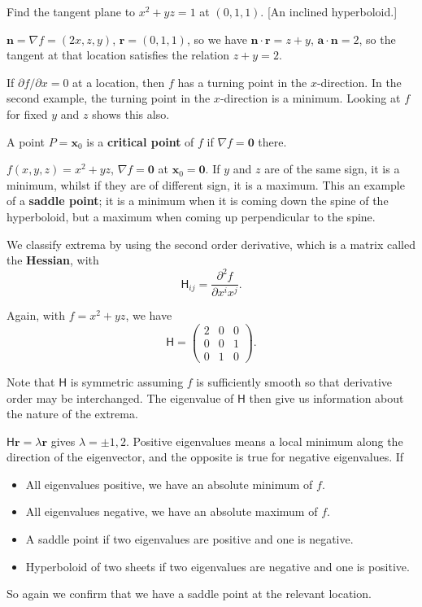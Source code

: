 \documentclass[letter-paper]{tufte-book}
\newenvironment{example}[1][Example]{\begin{trivlist}
\item[\hskip \labelsep {\bfseries #1}]}{\end{trivlist}}
\newcommand{\dy}{\partial}
\newcommand{\ddy}[2]{\frac{\dy#1}{\dy#2}}
\newcommand{\ab}{\boldsymbol{a}}
\newcommand{\nb}{\boldsymbol{n}}
\newcommand{\xb}{\boldsymbol{x}}
\newcommand\Def[1]{\textbf{#1}}
\begin{document}
\begin{example}
	Find the tangent plane to $x^2+yz=1$ at $(0,1,1)$. [An inclined
	hyperboloid.]
	
	$\nb=\nabla f=(2x,z,y)$, $\boldsymbol{r}=(0,1,1)$, so we have
	$\nb\cdot\boldsymbol{r}=z+y$, $\ab\cdot\nb=2$, so the tangent at that
	location satisfies the relation $z+y=2$.
\end{example}
If $\dy f/\dy x=0$ at a location, then $f$ has a turning point in the
$x$-direction. In the second example, the turning point in the $x$-direction is
a minimum. Looking at $f$ for fixed $y$ and $z$ shows this also.

A point $P=\xb_0$ is a \Def{critical point} of $f$ if $\nabla
f=\boldsymbol{0}$ there.
\begin{example}
	$f(x,y,z)=x^2+yz$, $\nabla f=\boldsymbol{0}$ at $\xb_0=\boldsymbol{0}$. If
	$y$ and $z$ are of the same sign, it is a minimum, whilst if they are of
	different sign, it is a maximum. This an example of a \Def{saddle
	point}; it is a minimum when it is coming down the spine of the hyperboloid,
	but a maximum when coming up perpendicular to the spine.
\end{example}

We classify extrema by using the second order derivative, which is a matrix
called the \Def{Hessian}, with
\begin{equation}
	\mathsf{H}_{ij}=\ddy{^2 f}{x^i x^j}.
\end{equation}
\begin{example}
	Again, with $f=x^2+yz$, we have
	\begin{equation*}
		\mathsf{H}=\begin{pmatrix}2&0&0\\0&0&1\\0&1&0\end{pmatrix}.
	\end{equation*}
\end{example}
Note that $\mathsf{H}$ is symmetric assuming $f$ is sufficiently smooth so that
derivative order may be interchanged. The eigenvalue of $\mathsf{H}$ then give
us information about the nature of the extrema.
\begin{example}
	$\mathsf{H}\boldsymbol{r}=\lambda\boldsymbol{r}$ gives $\lambda=\pm1,2$.
	Positive eigenvalues means a local minimum along the direction of the
	eigenvector, and the opposite is true for negative eigenvalues. If
	\begin{itemize}
		\item All eigenvalues positive, we have an absolute minimum of $f$.
		\item All eigenvalues negative, we have an absolute maximum of $f$.
		\item A saddle point if two eigenvalues are positive and one is
		negative.
		\item Hyperboloid of two sheets if two eigenvalues are negative and one
		is positive.
	\end{itemize}
	So again we confirm that we have a saddle point at the relevant location.
\end{example}
\end{document}
